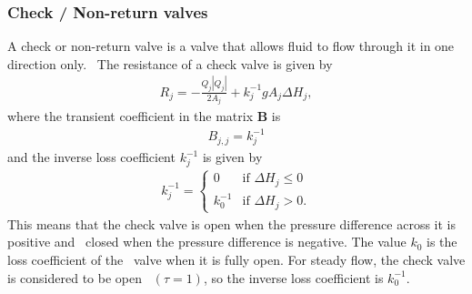 \subsubsection{Check / Non-return valves}

A check or non-return valve is a valve that allows fluid to flow through it in one direction only. \ 
The resistance of a check valve is given by
\begin{align} \label{check_valve_resistance}
    \boxed{ R_j = - \frac{Q_j|Q_j| }{2 A_j} + k_j^{-1} g A_j \Delta H_j, }
\end{align}
where the transient coefficient in the matrix $\mathbf{B}$ is
\begin{align}
    \boxed{ B_{j,j} = k_j^{-1} }
\end{align}
and the inverse loss coefficient $k_j^{-1}$ is given by
\begin{align}
    \boxed{ 
        k_j^{-1} = 
        \begin{cases}
            0 & \text{if } \Delta H_j \leq 0 \\
            k_0^{-1} & \text{if } \Delta H_j > 0.
        \end{cases}
    }
\end{align}
This means that the check valve is open when the pressure difference across it is positive and \ 
closed when the pressure difference is negative. The value $k_0$ is the loss coefficient of the \ 
valve when it is fully open. For steady flow, the check valve is considered to be open \ 
$(\tau = 1)$, so the inverse loss coefficient is $k_0^{-1}$. 
